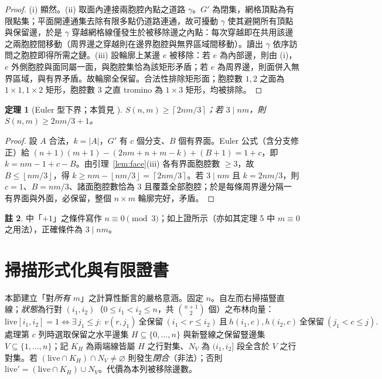 \documentclass[11pt]{ctexart}
\newtheorem{theorem}{定理}[section]
\theoremstyle{definition}
\newtheorem{remark}[theorem]{註}
\newcommand{\ceil}[1]{\left\lceil #1 \right\rceil}
\newcommand{\floor}[1]{\left\lfloor #1 \right\rfloor}
\begin{document}
\begin{proof}
(i) 顯然。(ii) 取面內連接兩胞腔內點之道路 $\gamma$。$G'$ 為閉集，網格頂點為有限點集；平面開連通集去除有限多點仍道路連通，故可擾動 $\gamma$ 使其避開所有頂點與保留邊，於是 $\gamma$ 穿越網格線僅發生於被移除邊之內點：每次穿越即在共用該邊之兩胞腔間移動（周界邊之穿越則在邊界胞腔與無界區域間移動）。讀出 $\gamma$ 依序訪問之胞腔即得所需之鏈。(iii) 設輪廓上某邊 $e$ 被移除：若 $e$ 為內部邊，則由 (i)，$e$ 外側胞腔與面同屬一面，與胞腔集恰為該矩形矛盾；若 $e$ 為周界邊，則面併入無界區域，與有界矛盾。故輪廓全保留。合法性排除矩形面；胞腔數 $1,2$ 之面為 $1\times1,1\times2$ 矩形，胞腔數 $3$ 之直 tromino 為 $1\times 3$ 矩形，均被排除。
\end{proof}

\begin{theorem}[Euler 型下界；本質見 \cite{NT25}]\label{thm:euler}
$S(n,m)\ge\ceil{2nm/3}$；若 $3\mid nm$，則 $S(n,m)\ge 2nm/3+1$。
\end{theorem}

\begin{proof}
設 $A$ 合法，$k=|A|$，$G'$ 有 $c$ 個分支、$B$ 個有界面。Euler 公式（含分支修正）給
$(n{+}1)(m{+}1)-(2nm{+}n{+}m-k)+(B{+}1)=1+c$，即 $k=nm-1+c-B$。由引理~\ref{lem:face}(iii) 各有界面胞腔數 $\ge 3$，故 $B\le\floor{nm/3}$，得 $k\ge nm-\floor{nm/3}=\ceil{2nm/3}$。若 $3\mid nm$ 且 $k=2nm/3$，則 $c=1$、$B=nm/3$、諸面胞腔數恰為 $3$ 且覆蓋全部胞腔；於是每條周界邊分隔一有界面與外面，必保留，整個 $n\times m$ 輪廓完好，矛盾。
\end{proof}

\begin{remark}\label{rem:errata}
\cite{NT25} 中「$+1$」之條件寫作 $n\equiv 0\pmod 3$；如上證所示（亦如其定理 5 中 $m\equiv 0$ 之用法），正確條件為 $3\mid nm$。
\end{remark}

\section{掃描形式化與有限證書}\label{sec:scan}

本節建立「對\emph{所有} $m$」之計算性斷言的嚴格意涵。固定 $n$。自左而右掃描豎直線；\emph{狀態}為行對 $(i_1,i_2)$（$0\le i_1<i_2\le n$，共 $\binom{n+1}{2}$ 個）之布林向量：
\[
\mathrm{live}[i_1,i_2]=1 \iff \exists\, j_1\le j:\ v(r,j_1)\ \text{全保留}\ (i_1<r\le i_2)\ \text{且}\ h(i_1,c),h(i_2,c)\ \text{全保留}\ (j_1<c\le j).
\]
處理第 $c$ 列時選取保留之水平邊集 $H\subseteq\{0,\dots,n\}$ 與新豎線之保留豎邊集 $V\subseteq\{1,\dots,n\}$；記 $K_H$ 為兩端線皆屬 $H$ 之行對集、$N_V$ 為 $(i_1,i_2]$ 段全含於 $V$ 之行對集。若 $(\mathrm{live}\cap K_H)\cap N_V\ne\varnothing$ 則發生\emph{閉合}（非法）；否則 $\mathrm{live}'=(\mathrm{live}\cap K_H)\cup N_V$。代價為本列被移除邊數。
\end{document}
